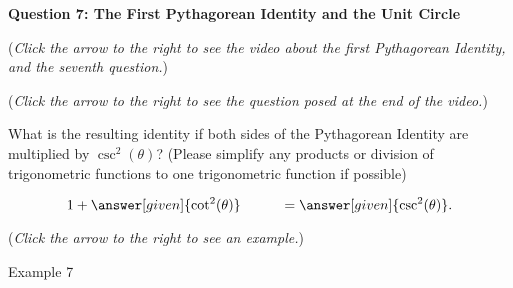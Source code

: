 \documentclass{ximera}
\begin{document}
\textbf{Question 7: The First Pythagorean Identity and the Unit Circle}
\begin{question}
\begin{flushright}
{\color{blue}(\emph{Click the arrow to the right to see the
video about the first Pythagorean Identity, and the seventh question.})}
\end{flushright}
\begin{center}
\begin{expandable}
{\color{blue}(\emph{Click the arrow to the right to see the question
posed at the end of the video.})}
\begin{expandable}
What is the resulting identity if both sides of the Pythagorean Identity are multiplied by $\csc^2(\theta)$? (Please simplify any products or division of trigonometric functions to one trigonometric function if possible)
\begin{prompt}
\[
1 + \answer[given]{\cot^2(\theta)} \hspace{1cm} = \answer[given]{\csc^2(\theta)}.
\]
\end{prompt}
\begin{flushright}
{\color{blue}(\emph{Click the arrow to the right to see an example.})}
\end{flushright}
\begin{expandable}
Example 7
\end{expandable}
\end{expandable}
\end{expandable}
\end{center}
\end{question}
\end{document}
